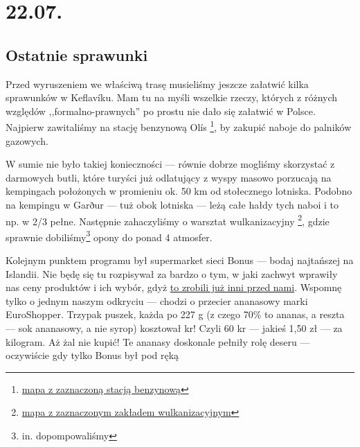 \chapter*{22.07.}

\section*{Ostatnie sprawunki}

\indent Przed wyruszeniem we właściwą trasę musieliśmy jeszcze załatwić kilka sprawunków w Keflavíku. Mam tu na myśli wszelkie rzeczy, których z różnych względów ,,formalno-prawnych'' po prostu nie dało się załatwić w Polsce.
Najpierw zawitaliśmy na stację benzynową Olís \footnote{\href{https://www.google.com/url?q=https\%3A\%2F\%2Fmaps.google.com\%2Fmaps\%3Fq\%3D63.979816\%2C-22.54672}{mapa z zaznaczoną stacją benzynową}}, by zakupić naboje do palników gazowych.

W sumie nie było takiej konieczności --- równie dobrze mogliśmy skorzystać z darmowych butli, które turyści już odlatujący z wyspy masowo porzucają na kempingach położonych w promieniu ok. 50 km od stołecznego lotniska. Podobno na kempingu w Garður --- tuż obok lotniska --- leżą całe hałdy tych naboi i to np. w 2/3 pełne.
Następnie zahaczyliśmy o warsztat wulkanizacyjny \footnote{\href{https://www.google.com/url?q=https\%3A\%2F\%2Fmaps.google.com\%2Fmaps\%3Fq\%3D63.982619\%2C-22.546328}{mapa z zaznaczonym zakładem wulkanizacyjnym}}, gdzie sprawnie dobiliśmy\footnote{in. dopompowaliśmy} opony do ponad 4 atmosfer.



Kolejnym punktem programu był supermarket sieci Bonus --- bodaj najtańszej na Islandii. Nie będę się tu rozpisywał za bardzo o tym, w jaki zachwyt wprawiły nas ceny produktów i ich wybór, gdyż \href{http://www.roboppy.net/food/2009/04/iceland-day-1-part-ii-reykjavik-bonus-supermarket-skyr.html}{to zrobili już inni przed nami}. Wspomnę tylko o jednym naszym odkryciu --- chodzi o przecier ananasowy marki EuroShopper. Trzypak puszek, każda po 227 g (z czego 70\% to ananas, a reszta --- sok ananasowy, a nie syrop) kosztował kr! Czyli 60 kr --- jakieś 1,50 zł --- za kilogram. Aż żal nie kupić! Te ananasy doskonale pełniły rolę deseru --- oczywiście gdy tylko Bonus był pod ręką\textellipsis

